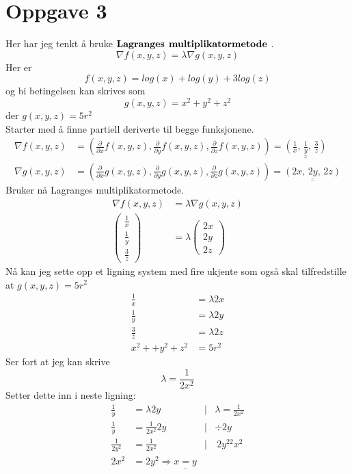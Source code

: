 \documentclass[a4paper,12pt,norsk]{article}
\begin{document}
\section{Oppgave 3}
Her har jeg tenkt å bruke $\bold{Lagranges}$ $\bold{multiplikatormetode}$ . $$\nabla f(x,y,z) = \lambda \nabla g(x,y,z)$$ Her er $$f(x,y,z)=log(x) + log(y) + 3log(z)$$ og bi betingelsen kan skrives som $$g(x,y,z)=x^2+y^2+z^2$$
der $g(x,y,z) = 5r^2$\\
Starter med å finne partiell deriverte til begge funksjonene.
\begin{align*}
\nabla f(x,y,z) &=\left( \frac{\partial}{\partial x}f(x,y,z), \frac{\partial}{\partial y}f(x,y,z), \frac{\partial}{\partial z}f(x,y,z)\right) = \underline{\underline{\left(\frac{1}{x}\text{, } \frac{1}{y}\text{, } \frac{3}{z} \right)}}\\
\nabla g(x,y,z) &=\left( \frac{\partial}{\partial x}g(x,y,z), \frac{\partial}{\partial y}g(x,y,z), \frac{\partial}{\partial z}g(x,y,z)\right) = \underline{\underline{\left(2x\text{, }2y\text{, }2z \right)}}
\end{align*}
Bruker nå Lagranges multiplikatormetode.
\begin{align*}
\nabla f(x,y,z) &= \lambda \nabla g(x,y,z)\\
\left({\begin{array}{cc} \frac{1}{x}\\ \frac{1}{y}\\ \frac{3}{z}  \end{array}}\right) 
&= \lambda \left(\begin{array}{cc} 2x\\2y\\2z  \end{array}\right)
\end{align*}
Nå kan jeg sette opp et ligning system med fire ukjente som også skal tilfredstille at 
$g(x,y,z) = 5r^2$
\begin{align*}
\frac{1}{x} &= \lambda 2x\\
\frac{1}{y} &= \lambda 2y \\
\frac{3}{z} &= \lambda 2z \\
x^2 + +y^2 + z^2 &=5r^2
\end{align*}
Ser fort at jeg kan skrive $$\lambda = \frac{1}{2x^2}$$
Setter dette inn i neste ligning:
\begin{align*}
\frac{1}{y} &= \lambda 2y &|& \lambda = \frac{1}{2x^2}\\
\frac{1}{y} &= \frac{1}{2x^2}2y &|&\div 2y\\
\frac{1}{2y^2} &= \frac{1}{2x^2} &|&\ 2y^22x^2\\
2x^2 &= 2y^2 \Rightarrow \underline{x = y}
\end{align*}
\end{document}
